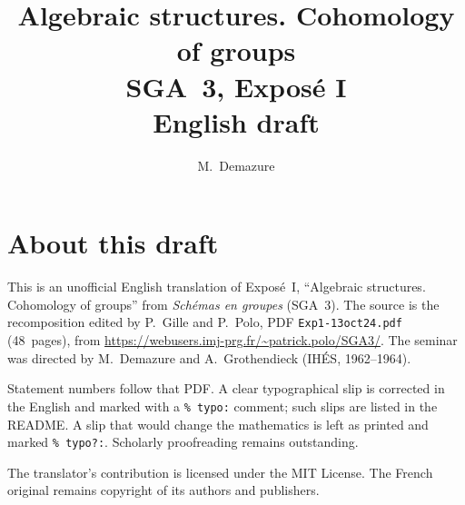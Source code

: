 \documentclass[11pt,a4paper,oneside]{amsbook}
\title[SGA~3, Expos\'e I (English draft)]{Algebraic structures. Cohomology of groups\\
{\normalsize SGA~3, Expos\'e I\\English draft}}
\author{M.\ Demazure}
\date{}
\begin{document}
\frontmatter
\maketitle

\chapter*{About this draft}
This is an unofficial English translation of Expos\'e~I, ``Algebraic structures. Cohomology of groups''
from \textit{Sch\'emas en groupes} (SGA~3).
The source is the recomposition edited by P.~Gille and P.~Polo,
PDF \texttt{Exp1-13oct24.pdf} (48~pages),
from \url{https://webusers.imj-prg.fr/~patrick.polo/SGA3/}.
The seminar was directed by M.~Demazure and A.~Grothendieck
(IH\'ES, 1962--1964).

Statement numbers follow that PDF. A clear typographical slip is
corrected in the English and marked with a \texttt{\% typo:} comment;
such slips are listed in the README. A slip that would change the
mathematics is left as printed and marked \texttt{\% typo?:}.
Scholarly proofreading remains outstanding.

The translator's contribution is licensed under the MIT License.
The French original remains copyright of its authors and publishers.

\tableofcontents
\mainmatter









\end{document}
